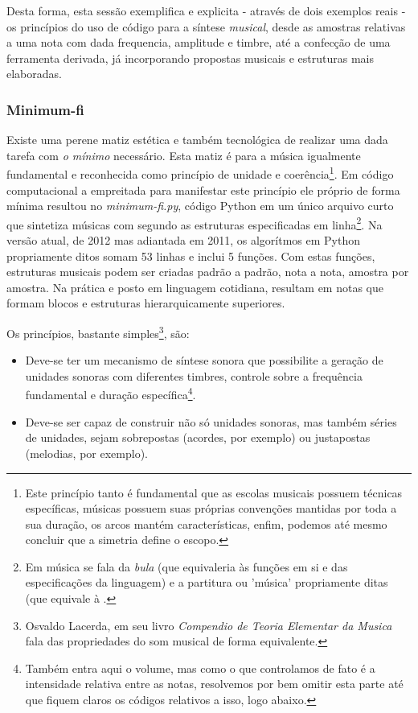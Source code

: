 Desta forma, esta sessão exemplifica e explicita - através de dois exemplos reais - os
princípios do uso de código para a síntese \emph{musical}, desde as amostras
relativas a uma nota com dada frequencia, amplitude e timbre, até a confecção
de uma ferramenta derivada, já incorporando propostas musicais e estruturas
mais elaboradas.

      \subsubsection{Minimum-fi}

Existe uma perene matiz estética e também tecnológica
de realizar uma dada tarefa com \emph{o mínimo} necessário.
Esta matiz é para a música igualmente
fundamental e reconhecida como
princípio de unidade e coerência\footnote{Este princípio tanto é fundamental
que as escolas musicais possuem técnicas específicas, músicas possuem suas
próprias convenções mantidas por toda a sua duração, os arcos mantém características,
enfim, podemos até mesmo concluir que a simetria define o escopo.}. Em código computacional
a empreitada para manifestar este princípio ele próprio de forma mínima
resultou no \emph{minimum-fi.py}, código Python em um único arquivo curto que sintetiza
músicas com segundo as estruturas especificadas em linha\footnote{Em música se fala da \emph{bula} (que equivaleria
às funções em si e das especificações da linguagem) e a partitura ou 'música' propriamente ditas (que equivale à .}.
Na versão atual, de 2012 mas adiantada em 2011, os algorítmos 
em Python propriamente ditos somam 
53 linhas e inclui 5 funções. Com estas funções, estruturas musicais podem 
ser criadas padrão a padrão, nota a nota, amostra por amostra. Na prática e posto em
linguagem cotidiana, resultam em notas que formam
blocos e estruturas hierarquicamente superiores.


Os princípios, bastante simples\footnote{Osvaldo Lacerda, em seu livro \emph{Compendio de Teoria Elementar da Musica} fala das propriedades do som musical de forma equivalente.}, são:
\begin{itemize}
  \item Deve-se ter um mecanismo de síntese sonora que
possibilite a geração de unidades sonoras com diferentes timbres, controle sobre a frequência fundamental e duração específica\footnote{Também entra aqui o volume, mas como o que controlamos de fato é a intensidade relativa entre as notas, resolvemos por bem omitir
esta parte até que fiquem claros os códigos relativos a isso, logo abaixo.}.
  \item Deve-se ser capaz de construir não só unidades sonoras, mas também séries de unidades, sejam sobrepostas (acordes, por exemplo)
  ou justapostas (melodias, por exemplo).
\end{itemize}

